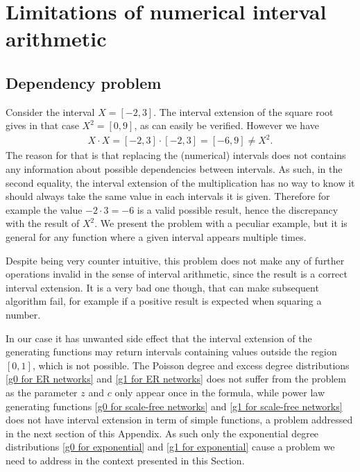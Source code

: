 \documentclass[
11pt, %
english, %
singlespacing, %
nolistspacing, %
liststotoc, %
headsepline, %
]{MastersDoctoralThesis} %
\begin{document}
\chapter{Limitations of numerical interval arithmetic}
\label{Appendix: Limitations of numerical interval arithmetic}

\section{Dependency problem}

Consider the interval $X = [-2, 3]$. The interval extension of the square root gives in that case $X^2 = [0, 9]$, as can easily be verified. However we have
\begin{align}
	X \cdot X = [-2, 3] \cdot [-2, 3] = [-6, 9] \neq X^2.
\end{align}
The reason for that is that replacing the (numerical) intervals does not contains any information about possible dependencies between intervals. As such, in the second equality, the interval extension of the multiplication has no way to know it should always take the same value in each intervals it is given. Therefore for example the value $-2 \cdot 3 = -6$ is a valid possible result, hence the discrepancy with the result of $X^2$. We present the problem with a peculiar example, but it is general for any function where a given interval appears multiple times.

Despite being very counter intuitive, this problem does not make any of further operations invalid in the sense of interval arithmetic, since the result is a correct interval extension. It is a very bad one though, that can make subsequent algorithm fail, for example if a positive result is expected when squaring a number.

In our case it has unwanted side effect that the interval extension of the generating functions may return intervals containing values outside the region $[0, 1]$, which is not possible. The Poisson degree and excess degree distributions \eqref{g0 for ER networks} and \eqref{g1 for ER networks} does not suffer from the problem as the parameter $z$ and $c$ only appear once in the formula, while power law generating functions \eqref{g0 for scale-free networks} and \eqref{g1 for scale-free networks} does not have interval extension in term of simple functions, a problem addressed in the next section of this Appendix. As such only the exponential degree distributions \eqref{g0 for exponential} and \eqref{g1 for exponential} cause a problem we need to address in the context presented in this Section.
\end{document}
